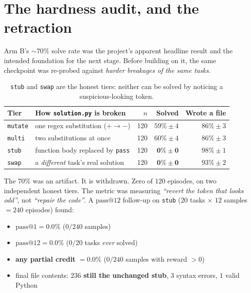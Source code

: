 \documentclass[10pt,a4paper]{article}
\newcommand{\code}[1]{\texttt{\small #1}}
\begin{document}
\section{The hardness audit, and the retraction}
\label{sec:hardness}

Arm B's ${\sim}70\%$ solve rate was the project's apparent headline result and
the intended foundation for the next stage. Before building on it, the same
checkpoint was re-probed against \emph{harder breakages of the same tasks}.

\begin{table}[h]
\centering\small
\begin{tabular}{@{}llrrr@{}}
\toprule
\textbf{Tier} & \textbf{How \code{solution.py} is broken} & $n$ & \textbf{Solved} & \textbf{Wrote a file} \\
\midrule
\code{mutate} & one regex substitution ($+ \rightarrow -$) & 120 & $59\% \pm 4$ & $86\% \pm 3$ \\
\code{multi} & two substitutions at once & 120 & $60\% \pm 4$ & $86\% \pm 3$ \\
\code{stub} & function body replaced by \code{pass} & 120 & $\mathbf{0\% \pm 0}$ & $98\% \pm 1$ \\
\code{swap} & a \emph{different} task's real solution & 120 & $\mathbf{0\% \pm 0}$ & $93\% \pm 2$ \\
\bottomrule
\end{tabular}
\caption{\code{stub} and \code{swap} are the honest tiers: neither can be solved
by noticing a suspicious-looking token.}
\end{table}

\begin{retraction}{The 70\% was an artifact. It is withdrawn.}
Zero of $120$ episodes, on two independent honest tiers. The metric was
measuring \emph{``revert the token that looks odd''}, not \emph{``repair the
code''}. A $\mathrm{pass@}12$ follow-up on \code{stub} ($20$ tasks $\times$ $12$
samples $=240$ episodes) found:
\begin{itemize}
\item $\mathrm{pass@}1 = 0.0\%$ \quad ($0/240$ samples)
\item $\mathrm{pass@}12 = 0.0\%$ \quad ($0/20$ tasks \emph{ever} solved)
\item \textbf{any partial credit} $= 0.0\%$ \quad ($0/240$ samples with reward $>0$)
\item final file contents: \textbf{$236$ still the unchanged stub}, $3$ syntax
errors, $1$ valid Python
\end{itemize}
\end{retraction}
\end{document}
